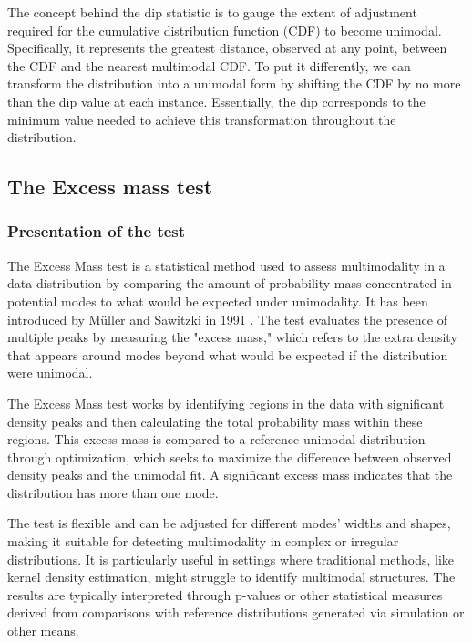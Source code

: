 The concept behind the dip statistic is to gauge the extent of adjustment required for the cumulative distribution function (CDF) to become unimodal. Specifically, it represents the greatest distance, observed at any point, between the CDF and the nearest multimodal CDF. To put it differently, we can transform the distribution into a unimodal form by shifting the CDF by no more than the dip value at each instance. Essentially, the dip corresponds to the minimum value needed to achieve this transformation throughout the distribution.



\subsection{The Excess mass test}

\subsubsection{Presentation of the test}
The Excess Mass test is a statistical method used to assess multimodality in a data distribution by comparing the amount of probability mass concentrated in potential modes to what would be expected under unimodality.  It has been introduced by Müller and Sawitzki in 1991 \cite{muller1991excess}. The test evaluates the presence of multiple peaks by measuring the "excess mass," which refers to the extra density that appears around modes beyond what would be expected if the distribution were unimodal.

The Excess Mass test works by identifying regions in the data with significant density peaks and then calculating the total probability mass within these regions. This excess mass is compared to a reference unimodal distribution through optimization, which seeks to maximize the difference between observed density peaks and the unimodal fit. A significant excess mass indicates that the distribution has more than one mode.

The test is flexible and can be adjusted for different modes' widths and shapes, making it suitable for detecting multimodality in complex or irregular distributions. It is particularly useful in settings where traditional methods, like kernel density estimation, might struggle to identify multimodal structures. The results are typically interpreted through p-values or other statistical measures derived from comparisons with reference distributions generated via simulation or other means.\\


